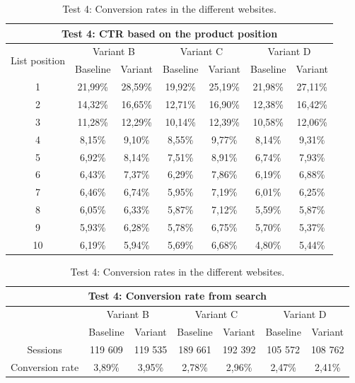 \begin{table}[p]
    \centering
    
    \begin{tabular}{|c||c|c||c|c||c|c|}
    \hline
    \multicolumn{7}{|c|}{Test 4: CTR based on the product position} \\ \hline \hline
    \multirow{ 2}{4em}{List position} & \multicolumn{2}{|c||}{Variant B} & \multicolumn{2}{|c||}{Variant C} & \multicolumn{2}{|c|}{Variant D} \\ \cline{2-7}
    & Baseline & Variant & Baseline & Variant & Baseline & Variant \\ \hline
    1 & 21,99\% & 28,59\% & 19,92\% & 25,19\% & 21,98\% & 27,11\% \\ \hline
    2 & 14,32\% & 16,65\% & 12,71\% & 16,90\% & 12,38\% & 16,42\% \\ \hline
    3 & 11,28\% & 12,29\% & 10,14\% & 12,39\% & 10,58\% & 12,06\% \\ \hline
    4 & 8,15\% & 9,10\% & 8,55\% & 9,77\% & 8,14\% & 9,31\% \\ \hline
    5 & 6,92\% & 8,14\% & 7,51\% & 8,91\% & 6,74\% & 7,93\% \\ \hline
    6 & 6,43\% & 7,37\% & 6,29\% & 7,86\% & 6,19\% & 6,88\% \\ \hline
    7 & 6,46\% & 6,74\% & 5,95\% & 7,19\% & 6,01\% & 6,25\% \\ \hline
    8 & 6,05\% & 6,33\% & 5,87\% & 7,12\% & 5,59\% & 5,87\% \\ \hline
    9 & 5,93\% & 6,28\% & 5,78\% & 6,75\% & 5,70\% & 5,37\% \\ \hline
    10 & 6,19\% & 5,94\% & 5,69\% & 6,68\% & 4,80\% & 5,44\% \\ \hline
    \end{tabular}
    \caption{Test 4: CTR in the different websites.}
    \label{tab:search_v4_ctr}
    
    \begin{tabular}{|c||c|c||c|c||c|c|}
    \hline
    \multicolumn{7}{|c|}{Test 4: Conversion rate from search} \\ \hline \hline
    & \multicolumn{2}{|c||}{Variant B} & \multicolumn{2}{|c||}{Variant C} & \multicolumn{2}{|c|}{Variant D} \\ \cline{2-7}
    & Baseline & Variant & Baseline & Variant & Baseline & Variant \\ \hline
    Sessions & 119 609 & 119 535 & 189 661 & 192 392 & 105 572 & 108 762 \\ \hline
    Conversion rate & 3,89\% & 3,95\% & 2,78\% & 2,96\% & 2,47\% & 2,41\% \\ \hline
    \end{tabular}
    \caption{Test 4: Conversion rates in the different websites.}
    \label{tab:search_v4}
\end{table}


